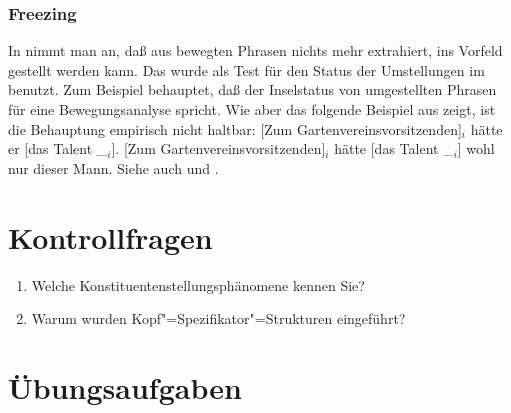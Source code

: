 \subsubsection{Freezing}

In \gb nimmt man an, daß aus bewegten Phrasen nichts mehr extrahiert, \dash \zb ins Vorfeld gestellt werden kann.
Das wurde als Test für den Status der Umstellungen im \mf benutzt. Zum Beispiel \citet{Diesing92a} behauptet,
daß der Inselstatus von umgestellten Phrasen für eine Bewegungsanalyse spricht. Wie aber
das folgende Beispiel aus  zeigt, ist die Behauptung empirisch nicht haltbar:
\eal
\ex {}[Zum Gartenvereinsvorsitzenden]$_i$ hätte er [das Talent \_$_i$].
\ex {}[Zum Gartenvereinsvorsitzenden]$_i$ hätte [das Talent \_$_i$] wohl nur dieser Mann.\label{bsp-gartenvereinsvorsitzender}
\zl
Siehe auch  und .%

\section*{Kontrollfragen}

\begin{enumerate}
\item Welche Konstituentenstellungsphänomene kennen Sie?
\item Warum wurden Kopf"=Spezifikator"=Strukturen eingeführt?
\end{enumerate}

\section*{Übungsaufgaben}

